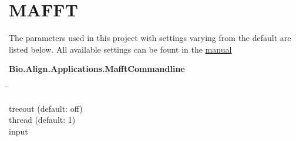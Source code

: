 \section{MAFFT} \label{sec:Clustering_Pipeline}

\blindtext
\autocite{katoh_mafft_2002}
\autocite{cock_biopython_2009}

The parameters used in this project with settings varying from the default are listed below. All available settings can be fount in the \href{https://mafft.cbrc.jp/alignment/software/}{manual}

\begin{leftbar}
    \textbf{Bio.Align.Applications.MafftCommandline}
    \begin{nstabbing}
        \qquad\qquad\qquad\qquad\qquad\quad\=\kill
    
        treeout \> (default: off)\\
        
        thread \> (default: 1)\\
        
        input \>
        
    \end{nstabbing}
\end{leftbar}

